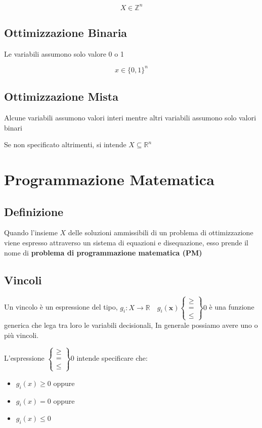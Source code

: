             {
                \large

                $$
                X \in \mathbb{Z}^n
                $$
            }

            \subsection{Ottimizzazione Binaria}
            Le variabili assumono solo valore 0 o 1

            {
                \large

                $$
                x \in \{0,1\}^n
                $$
            }

            \subsection{Ottimizzazione Mista}
            Alcune variabili assumono valori interi mentre altri variabili assumono solo valori binari

            Se non specificato altrimenti, si intende $X \subseteq \mathbb{R}^n$

    \newpage
    \section{Programmazione Matematica}
        \subsection{Definizione}
        Quando l'insieme $X$ delle soluzioni ammissibili di un problema di ottimizzazione viene espresso attraverso un sistema di equazioni e disequazione, esso prende il nome di \textbf{problema di programmazione matematica (PM)}

        \subsection{Vincoli}
        Un vincolo è un espressione del tipo,
        $g_i: X \to \mathbb{R} \quad
        g_i(\mathbf{x}) 
            \begin{Bmatrix} 
                \ge \\ = \\ \le 
            \end{Bmatrix} 0
        $ 
        è una funzione generica che lega tra loro le variabili decisionali, In generale possiamo avere uno o più vincoli.

        L'espressione $\begin{Bmatrix} \ge \\ = \\ \le \end{Bmatrix}0$ intende specificare che:
        \begin{itemize}
            \item $g_i(x) \geq 0$ oppure
            \item $g_i(x) = 0$ oppure
            \item $g_i(x) \leq 0$
        \end{itemize}

